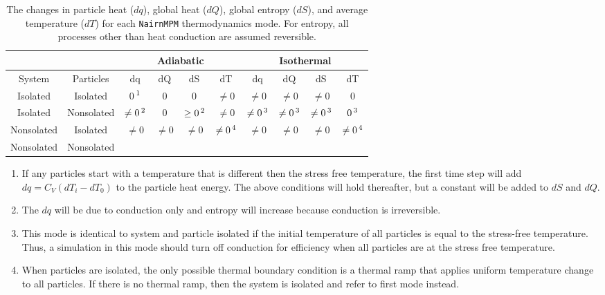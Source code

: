 \documentclass[11pt]{book}
\begin{document}
\begin{table}\renewcommand{\arraystretch}{1.2}
\caption{The changes in particle heat ($dq$), global heat ($dQ$), global entropy ($dS$), and average temperature ($dT$) for each {\tt NairnMPM} thermodynamics mode. For entropy, all processes other than heat conduction are assumed reversible.}
\vskip6pt
\label{tdmodes}
\centering
\begin{tabular}{|c|c|c|c|c|c|c|c|c|c|}
\hline
 &  & \multicolumn{4}{|c|}{Adiabatic} & \multicolumn{4}{|c|}{Isothermal} \\
\hline
System & Particles & dq & dQ & dS & dT & dq & dQ & dS & dT \\
\hline
Isolated & Isolated & 0$\thinspace^1$ & 0 & 0 & $\ne0$ & $\ne0$ & $\ne0$ & $\ne0$ & 0 \\
\hline
Isolated & Nonsolated & $\ne0\thinspace^2$ & 0 & $\ge0\thinspace^2$ & $\ne0$ &
          $\ne0\thinspace^3$ & $\ne0\thinspace^3$ & $\ne0\thinspace^3$ & $0\thinspace^3$ \\
\hline
Nonsolated & Isolated & \multirow{2}{*}{$\ne0$} & \multirow{2}{*}{$\ne0$} & \multirow{2}{*}{$\ne0$}
      & \multirow{2}{*}{$\ne0\thinspace^4$} & \multirow{2}{*}{$\ne0$} & \multirow{2}{*}{$\ne0$} & 
      \multirow{2}{*}{$\ne0$} & \multirow{2}{*}{$\ne0\thinspace^4$} \\
\cline{1-2}
Nonsolated & Nonsolated & & & & & & & &  \\
\hline
\end{tabular}
{\footnotesize
\begin{enumerate}
\item If any particles start with a temperature that is different then the stress free temperature, the first
time step will add $dq=C_V(dT_i-dT_0)$ to the particle heat energy. The above conditions will hold thereafter, but a
constant will be added to $dS$ and $dQ$.
\item The $dq$ will be due to conduction only and entropy will increase because conduction is irreversible.
\item This mode is identical to system and particle isolated if the initial temperature of all particles is equal to the stress-free temperature. Thus, a simulation in this mode should turn off conduction for efficiency when all particles
are at the stress free temperature.
\item When particles are isolated, the only possible thermal boundary condition is a thermal ramp that applies uniform temperature change to all particles. If there is no thermal ramp, then the system is isolated and refer to first mode instead.
\end{enumerate}
}
\end{table}
\end{document}
